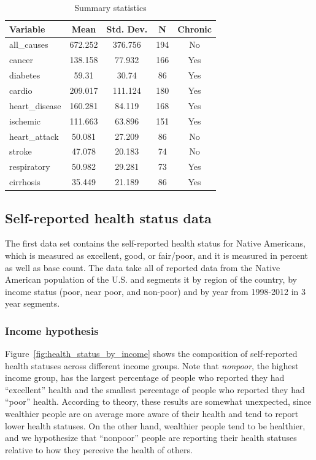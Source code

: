 \documentclass[12pt]{article}
\begin{document}
\begin{table}[htbp]\centering \caption{Summary statistics \label{sumstat}}
\begin{tabular}{l c c  c c}\hline\hline
\textbf{Variable} & \textbf{Mean} & \textbf{Std. Dev.} & \textbf{N} & \textbf{Chronic} \\\hline
all\_causes & 672.252 & 376.756  & 194 & No\\
cancer & 138.158 & 77.932  & 166 & Yes\\
diabetes & 59.31 & 30.74  & 86 & Yes\\
cardio & 209.017 & 111.124  & 180 & Yes\\
heart\_disease & 160.281 & 84.119  & 168 & Yes\\
ischemic & 111.663 & 63.896  & 151 & Yes\\
heart\_attack & 50.081 & 27.209  & 86 & No\\
stroke & 47.078 & 20.183  & 74 & No\\
respiratory & 50.982 & 29.281  & 73 & Yes\\
cirrhosis & 35.449 & 21.189  & 86 & Yes\\
\hline
\end{tabular}
\end{table}



\subsection{Self-reported health status data}
The first data set contains the self-reported health status for Native Americans, which is measured as excellent, good, or fair/poor, and it is measured in percent as well as base count.
The data take all of reported data from the Native American population of the U.S. and segments it by region of the country, by income status (poor, near poor, and non-poor) and by year from 1998-2012 in 3 year segments.

\subsubsection{Income hypothesis}
Figure~\ref{fig:health_status_by_income} shows the composition of self-reported health statuses across different income groups. Note that \emph{nonpoor}, the highest income group, has the largest percentage of people who reported they had ``excellent'' health and the smallest percentage of people who reported they had ``poor'' health. 
According to theory, these results are somewhat unexpected, since wealthier people are on average more aware of their health and tend to report lower health statuses. 
On the other hand, wealthier people tend to be healthier, and we hypothesize that ``nonpoor'' people are reporting their health statuses relative to how they perceive the health of others. 
\end{document}
